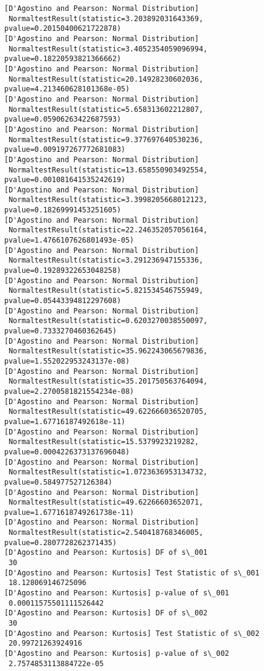 \documentclass[11pt]{article}
\begin{document}
\begin{Verbatim}[commandchars=\\\{\}]
[D'Agostino and Pearson: Normal Distribution]
 NormaltestResult(statistic=3.203892031643369, pvalue=0.20150400621722878)
[D'Agostino and Pearson: Normal Distribution]
 NormaltestResult(statistic=3.4052354059096994, pvalue=0.18220593821366662)
[D'Agostino and Pearson: Normal Distribution]
 NormaltestResult(statistic=20.14928230602036, pvalue=4.213460628101368e-05)
[D'Agostino and Pearson: Normal Distribution]
 NormaltestResult(statistic=5.658313602212807, pvalue=0.05906263422687593)
[D'Agostino and Pearson: Normal Distribution]
 NormaltestResult(statistic=9.377697640530236, pvalue=0.009197267772681083)
[D'Agostino and Pearson: Normal Distribution]
 NormaltestResult(statistic=13.658550903492554, pvalue=0.001081641535242619)
[D'Agostino and Pearson: Normal Distribution]
 NormaltestResult(statistic=3.3998205668012123, pvalue=0.18269991453251605)
[D'Agostino and Pearson: Normal Distribution]
 NormaltestResult(statistic=22.246352057056164, pvalue=1.4766107626801493e-05)
[D'Agostino and Pearson: Normal Distribution]
 NormaltestResult(statistic=3.291236947155336, pvalue=0.19289322653048258)
[D'Agostino and Pearson: Normal Distribution]
 NormaltestResult(statistic=5.821534546755949, pvalue=0.05443394812297608)
[D'Agostino and Pearson: Normal Distribution]
 NormaltestResult(statistic=0.6203270038550097, pvalue=0.7333270460362645)
[D'Agostino and Pearson: Normal Distribution]
 NormaltestResult(statistic=35.962243065679836, pvalue=1.552022953243137e-08)
[D'Agostino and Pearson: Normal Distribution]
 NormaltestResult(statistic=35.201750563764094, pvalue=2.2700581821554234e-08)
[D'Agostino and Pearson: Normal Distribution]
 NormaltestResult(statistic=49.622666036520705, pvalue=1.67716187492618e-11)
[D'Agostino and Pearson: Normal Distribution]
 NormaltestResult(statistic=15.5379923219282, pvalue=0.0004226373137696048)
[D'Agostino and Pearson: Normal Distribution]
 NormaltestResult(statistic=1.0723636953134732, pvalue=0.584977527126384)
[D'Agostino and Pearson: Normal Distribution]
 NormaltestResult(statistic=49.62266603652071, pvalue=1.6771618749261738e-11)
[D'Agostino and Pearson: Normal Distribution]
 NormaltestResult(statistic=2.540418768346005, pvalue=0.2807728262371435)
[D'Agostino and Pearson: Kurtosis] DF of s\_001
 30
[D'Agostino and Pearson: Kurtosis] Test Statistic of s\_001
 18.128069146725096
[D'Agostino and Pearson: Kurtosis] p-value of s\_001
 0.00011575501111526442
[D'Agostino and Pearson: Kurtosis] DF of s\_002
 30
[D'Agostino and Pearson: Kurtosis] Test Statistic of s\_002
 20.99721263924916
[D'Agostino and Pearson: Kurtosis] p-value of s\_002
 2.7574853113884722e-05

\end{Verbatim}
\end{document}
